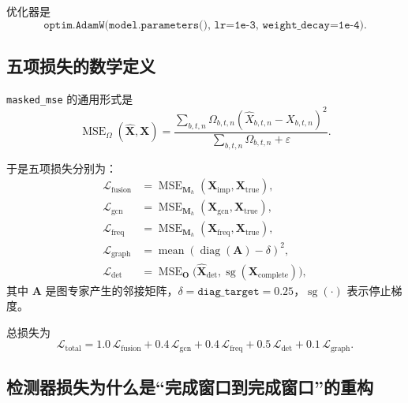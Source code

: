 \documentclass[UTF8]{ctexart}
\newcommand{\sg}{\operatorname{sg}}
\begin{document}
优化器是
\begin{equation}
    \texttt{optim.AdamW(model.parameters(), lr=1e-3, weight\_decay=1e-4)}.
\end{equation}

\subsection{五项损失的数学定义}

\texttt{masked\_mse} 的通用形式是
\begin{equation}
    \operatorname{MSE}_{\Omega}(\widehat{\bm{X}},\bm{X})
    =
    \frac{
        \sum_{b,t,n}
        \Omega_{b,t,n}
        \left(
            \widehat{X}_{b,t,n} - X_{b,t,n}
        \right)^2
    }{
        \sum_{b,t,n}\Omega_{b,t,n} + \varepsilon
    }.
\end{equation}

于是五项损失分别为：
\begin{align}
    \mathcal{L}_{\text{fusion}}
    &= \operatorname{MSE}_{\bm{M}_h}(\bm{X}_{\text{imp}},\bm{X}_{\text{true}}), \\
    \mathcal{L}_{\text{gcn}}
    &= \operatorname{MSE}_{\bm{M}_h}(\bm{X}_{\text{gcn}},\bm{X}_{\text{true}}), \\
    \mathcal{L}_{\text{freq}}
    &= \operatorname{MSE}_{\bm{M}_h}(\bm{X}_{\text{freq}},\bm{X}_{\text{true}}), \\
    \mathcal{L}_{\text{graph}}
    &= \operatorname{mean}\!\left(\operatorname{diag}(\bm{A}) - \delta\right)^2, \\
    \mathcal{L}_{\text{det}}
    &= \operatorname{MSE}_{\bm{O}}
    \big(
        \widehat{\bm{X}}_{\text{det}},
        \sg(\bm{X}_{\text{complete}})
    \big),
\end{align}
其中 \(\bm{A}\) 是图专家产生的邻接矩阵，\(\delta=\texttt{diag\_target}=0.25\)，\(\sg(\cdot)\) 表示停止梯度。

总损失为
\begin{equation}
    \mathcal{L}_{\text{total}}
    =
    1.0\,\mathcal{L}_{\text{fusion}}
    + 0.4\,\mathcal{L}_{\text{gcn}}
    + 0.4\,\mathcal{L}_{\text{freq}}
    + 0.5\,\mathcal{L}_{\text{det}}
    + 0.1\,\mathcal{L}_{\text{graph}}.
\end{equation}

\subsection{检测器损失为什么是“完成窗口到完成窗口”的重构}
\end{document}
